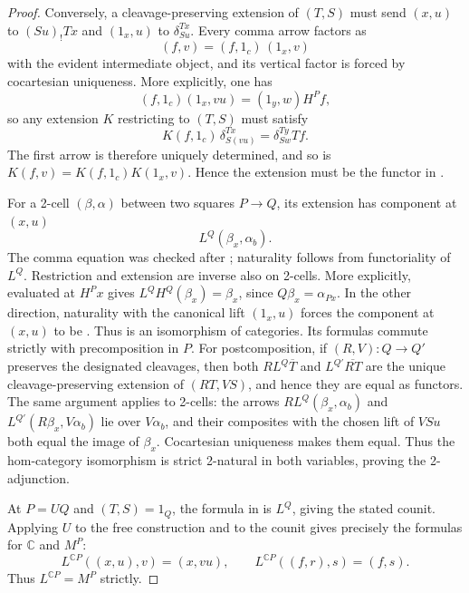 \documentclass[11pt]{article}
\theoremstyle{plain}
\theoremstyle{definition}
\theoremstyle{remark}
\newcommand{\C}{\mathbb{C}}
\numberwithin{equation}{section}
\begin{document}
\begin{proof}
Conversely, a cleavage-preserving extension of $(T,S)$ must send
$(x,u)$ to $(Su)_{!}Tx$ and $(1_x,u)$ to
$\delta^{Tx}_{Su}$.  Every comma arrow factors as
\begin{equation*}
(f,v)=(f,1_c)\,(1_x,v)
\end{equation*}
with the evident intermediate object, and its vertical factor is
forced by cocartesian uniqueness.  More explicitly, one has
\begin{equation*}
  (f,1_c)(1_x,vu)=(1_y,w)H^{P}f,
\end{equation*}
so any extension $K$ restricting to $(T,S)$ must satisfy
\begin{equation*}
  K(f,1_c)\,\delta^{Tx}_{S(vu)}=\delta^{Ty}_{Sw}Tf.
\end{equation*}
The first arrow is therefore uniquely determined, and so is
$K(f,v)=K(f,1_c)K(1_x,v)$.  Hence the extension must be the functor in
.

For a 2-cell $(\beta,\alpha)$ between two squares $P\to Q$, its
extension has component at $(x,u)$
\begin{equation}
L^{Q}(\beta_x,\alpha_b).
  \label{eq:extended-2cell}
\end{equation}
The comma equation was checked after ; naturality
follows from functoriality of $L^{Q}$.  Restriction and extension are
inverse also on 2-cells.  More explicitly,
 evaluated at $H^{P}x$ gives
$L^{Q}H^{Q}(\beta_x)=\beta_x$, since
$Q\beta_x=\alpha_{Px}$.  In the other direction, naturality with the
canonical lift $(1_x,u)$ forces the component at $(x,u)$ to be
.  Thus  is an isomorphism of
categories.  Its formulas commute strictly with precomposition in
$P$.  For postcomposition, if $(R,V)\colon Q\to Q'$ preserves the
designated cleavages, then both $R L^{Q}\overline T$ and
$L^{Q'}\overline{RT}$ are the unique cleavage-preserving extension of
$(RT,VS)$, and hence they are equal as functors.  The same argument
applies to 2-cells: the arrows
$R L^Q(\beta_x,\alpha_b)$ and
$L^{Q'}(R\beta_x,V\alpha_b)$ lie over $V\alpha_b$, and their
composites with the chosen lift of $VS u$ both equal the image of
$\beta_x$.  Cocartesian uniqueness makes them equal.  Thus the
hom-category isomorphism is strict
2-natural in both variables, proving the 2-adjunction.

At $P=UQ$ and $(T,S)=1_Q$, the formula in  is $L^{Q}$,
giving the stated counit.  Applying $U$ to the free construction and
to the counit gives precisely the formulas for $\C$ and $M^{P}$:
\begin{equation*}
  L^{\C P}((x,u),v)=(x,vu),
  \qquad
  L^{\C P}((f,r),s)=(f,s).
\end{equation*}
Thus $L^{\C P}=M^P$ strictly.
\end{proof}
\end{document}
